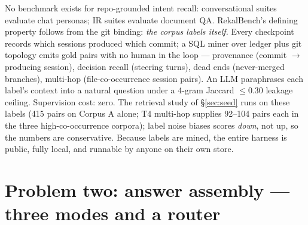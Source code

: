 \documentclass[twocolumn,10pt]{article}
\begin{document}
No benchmark exists for repo-grounded intent recall: conversational suites \citep{locomo2024} evaluate chat personas; IR suites evaluate document QA. RekalBench's defining property follows from the git binding: \emph{the corpus labels itself.} Every checkpoint records which sessions produced which commit; a SQL miner over ledger plus git topology emits gold pairs with no human in the loop --- provenance (commit $\to$ producing session), decision recall (steering turns), dead ends (never-merged branches), multi-hop (file-co-occurrence session pairs). An LLM paraphrases each label's context into a natural question under a 4-gram Jaccard $\le 0.30$ leakage ceiling. Supervision cost: zero. The retrieval study of \S\ref{sec:seed} runs on these labels (415 pairs on Corpus A alone; T4 multi-hop supplies 92--104 pairs each in the three high-co-occurrence corpora); label noise biases scores \emph{down}, not up, so the numbers are conservative. Because labels are mined, the entire harness is public, fully local, and runnable by anyone on their own store.

\section{Problem two: answer assembly --- three modes and a router}\label{sec:modes}
\end{document}
